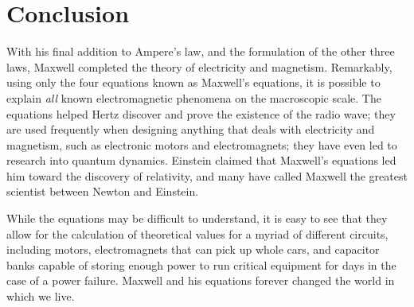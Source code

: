 \documentclass[12pt]{article}
\begin{document}
\section{Conclusion}

With his final addition to Ampere's law, and the formulation of the other three laws, Maxwell completed the theory of electricity and magnetism. Remarkably, using only the four equations known as Maxwell's equations, it is possible to explain \textit{all} known electromagnetic phenomena on the macroscopic scale. The equations helped Hertz discover and prove the existence of the radio wave; they are used frequently when designing anything that deals with electricity and magnetism, such as electronic motors and electromagnets; they have even led to research into quantum dynamics. Einstein claimed that Maxwell's equations led him toward the discovery of relativity, and many have called Maxwell the greatest scientist between Newton and Einstein.

While the equations may be difficult to understand, it is easy to see that they allow for the calculation of theoretical values for a myriad of different circuits, including motors, electromagnets that can pick up whole cars, and capacitor banks capable of storing enough power to run critical equipment for days in the case of a power failure. Maxwell and his equations forever changed the world in which we live.
\newpage
\nocite{Lewin}
\nocite{princeton}


\end{document}

